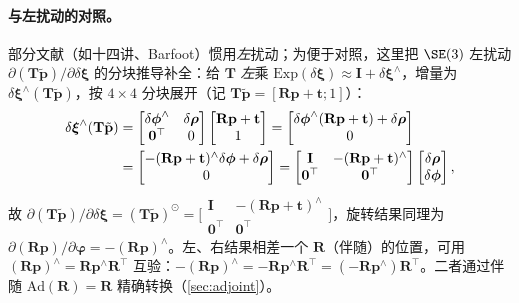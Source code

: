 \paragraph{与左扰动的对照。}部分文献（如十四讲、Barfoot）惯用\emph{左}扰动；为便于对照，这里把 $\SE(3)$ 左扰动 $\partial(\mathbf{T}\tilde{\mathbf{p}})/\partial\delta\boldsymbol{\xi}$ 的分块推导补全：给 $\mathbf{T}$ \emph{左}乘 $\mathrm{Exp}(\delta\boldsymbol{\xi})\approx\mathbf{I}+\delta\boldsymbol{\xi}^\wedge$，增量为 $\delta\boldsymbol{\xi}^\wedge(\mathbf{T}\tilde{\mathbf{p}})$，按 $4\times4$ 分块展开（记 $\mathbf{T}\tilde{\mathbf{p}}=[\mathbf{R}\mathbf{p}+\mathbf{t};1]$）：
\begin{align}
  \delta\boldsymbol{\xi}^\wedge(\mathbf{T}\tilde{\mathbf{p}})
  &=\begin{bmatrix}\delta\boldsymbol{\phi}^\wedge&\delta\boldsymbol{\rho}\\\mathbf{0}^\top&0\end{bmatrix}
    \begin{bmatrix}\mathbf{R}\mathbf{p}+\mathbf{t}\\1\end{bmatrix}
   =\begin{bmatrix}\delta\boldsymbol{\phi}^\wedge(\mathbf{R}\mathbf{p}+\mathbf{t})+\delta\boldsymbol{\rho}\\0\end{bmatrix}\notag\\
  &=\begin{bmatrix}-(\mathbf{R}\mathbf{p}+\mathbf{t})^\wedge\delta\boldsymbol{\phi}+\delta\boldsymbol{\rho}\\0\end{bmatrix}
   =\begin{bmatrix}\mathbf{I}&-(\mathbf{R}\mathbf{p}+\mathbf{t})^\wedge\\\mathbf{0}^\top&\mathbf{0}^\top\end{bmatrix}
    \begin{bmatrix}\delta\boldsymbol{\rho}\\\delta\boldsymbol{\phi}\end{bmatrix},
  \label{eq:left-pert-se3}
\end{align}
故 $\partial(\mathbf{T}\tilde{\mathbf{p}})/\partial\delta\boldsymbol{\xi}=(\mathbf{T}\tilde{\mathbf{p}})^\odot=\big[\begin{smallmatrix}\mathbf{I}&-(\mathbf{R}\mathbf{p}+\mathbf{t})^\wedge\\\mathbf{0}^\top&\mathbf{0}^\top\end{smallmatrix}\big]$，旋转结果同理为 $\partial(\mathbf{R}\mathbf{p})/\partial\boldsymbol{\varphi}=-(\mathbf{R}\mathbf{p})^\wedge$。左、右结果相差一个 $\mathbf{R}$（伴随）的位置，可用 $(\mathbf{R}\mathbf{p})^\wedge=\mathbf{R}\mathbf{p}^\wedge\mathbf{R}^\top$ 互验：$-(\mathbf{R}\mathbf{p})^\wedge=-\mathbf{R}\mathbf{p}^\wedge\mathbf{R}^\top=(-\mathbf{R}\mathbf{p}^\wedge)\mathbf{R}^\top$。二者通过伴随 $\mathrm{Ad}(\mathbf{R})=\mathbf{R}$ 精确转换（\cref{sec:adjoint}）。

